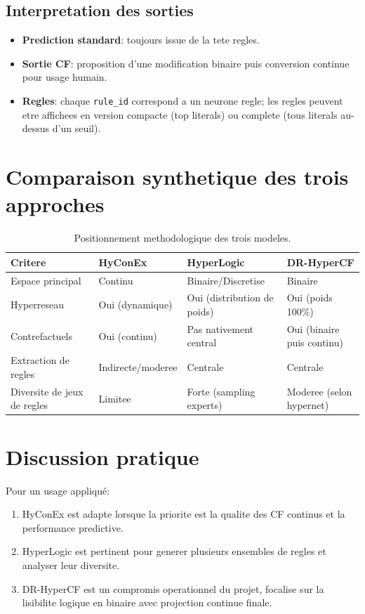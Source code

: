 \documentclass[11pt,a4paper]{article}
\begin{document}
\subsection{Interpretation des sorties}
\begin{itemize}
    \item \textbf{Prediction standard}: toujours issue de la tete regles.
    \item \textbf{Sortie CF}: proposition d'une modification binaire puis conversion continue pour usage humain.
    \item \textbf{Regles}: chaque \texttt{rule\_id} correspond a un neurone regle; les regles peuvent etre affichees en version compacte (top literals) ou complete (tous literals au-dessus d'un seuil).
\end{itemize}

\section{Comparaison synthetique des trois approches}
\begin{table}[h]
\centering
\begin{tabular}{@{}llll@{}}
\toprule
Critere & HyConEx & HyperLogic & DR-HyperCF \\
\midrule
Espace principal & Continu & Binaire/Discretise & Binaire \\
Hyperreseau & Oui (dynamique) & Oui (distribution de poids) & Oui (poids 100\%) \\
Contrefactuels & Oui (continu) & Pas nativement central & Oui (binaire puis continu) \\
Extraction de regles & Indirecte/moderee & Centrale & Centrale \\
Diversite de jeux de regles & Limitee & Forte (sampling experts) & Moderee (selon hypernet) \\
\bottomrule
\end{tabular}
\caption{Positionnement methodologique des trois modeles.}
\end{table}

\section{Discussion pratique}
Pour un usage appliqué:
\begin{enumerate}
    \item HyConEx est adapte lorsque la priorite est la qualite des CF continus et la performance predictive.
    \item HyperLogic est pertinent pour generer plusieurs ensembles de regles et analyser leur diversite.
    \item DR-HyperCF est un compromis operationnel du projet, focalise sur la lisibilite logique en binaire avec projection continue finale.
\end{enumerate}
\end{document}

